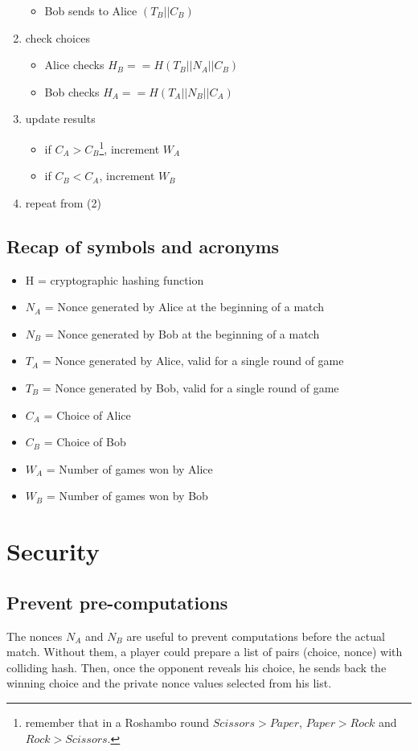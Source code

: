 \documentclass[11 pt]{article}
\begin{document}
\begin{enumerate}
\begin{itemize}
		\item Bob sends to Alice $(T_B || C_B)$
	\end{itemize}
	\item check choices
	\begin{itemize}
		\item Alice checks $H_B == H( T_B || N_A || C_B )$
		\item Bob checks $H_A == H( T_A || N_B || C_A )$
	\end{itemize}
	\item update results
	\begin{itemize}
		\item if $C_A > C_B$\footnote{remember that in a Roshambo round $Scissors > Paper$, $Paper > Rock$ and $Rock > Scissors$.}, increment $W_A$
		\item if $C_B < C_A$, increment $W_B$
	\end{itemize}
	\item repeat from (2)
\end{enumerate}

\subsection{Recap of symbols and acronyms}
\begin{itemize}
	\item H = cryptographic hashing function
	\item $N_A$ = Nonce generated by Alice at the beginning of a match
	\item $N_B$ = Nonce generated by Bob at the beginning of a match
	\item $T_A$ = Nonce generated by Alice, valid for a single round of game
	\item $T_B$ = Nonce generated by Bob, valid for a single round of game
	\item $C_A$ = Choice of Alice
	\item $C_B$ = Choice of Bob
	\item $W_A$ = Number of games won by Alice
	\item $W_B$ = Number of games won by Bob
\end{itemize}

\section{Security}
\subsection{Prevent pre-computations}
The nonces $N_A$ and $N_B$ are useful to prevent computations before the actual match. Without them, a player could prepare a list of pairs (choice, nonce) with colliding hash. Then, once the opponent reveals his choice, he sends back the winning choice and the private nonce values selected from his list.
\end{document}
